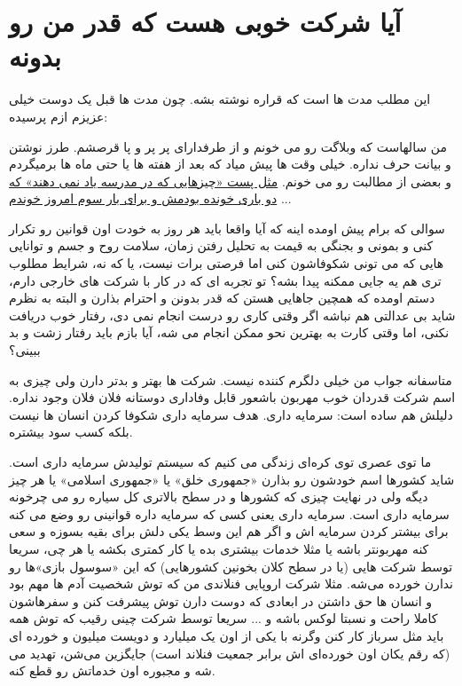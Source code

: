 \section{آیا شرکت خوبی هست که قدر من رو بدونه}
این مطلب مدت ها است که قراره نوشته بشه. چون مدت ها قبل یک دوست خیلی عزیزم ازم پرسیده:
\begin{mybox}
من سالهاست که وبلاگت رو می خونم و از طرفدارای پر پر و پا قرصشم. طرز نوشتن و بیانت حرف نداره. خیلی وقت ها پیش میاد که بعد از هفته ها یا حتی ماه ها برمیگردم و بعضی از مطالبت رو می خونم.
\href{http://jadi.net/2011/04/\%DA\%86\%DB\%8C\%D8\%B2\%D9\%87\%D8\%A7\%DB\%8C\%DB\%8C-\%DA\%A9\%D9\%87-\%D8\%AF\%D8\%B1-\%D9\%85\%D8\%AF\%D8\%B1\%D8\%B3\%D9\%87-\%DB\%8C\%D8\%A7\%D8\%AF-\%D9\%86\%D9\%85\%DB\%8C-\%D8\%AF\%D9\%87\%D9\%86\%D8\%AF/}{مثل پست «چیزهایی که در مدرسه یاد نمی دهند» که دو باری خونده بودمش و برای بار سوم امروز خوندم}
...

سوالی که برام پیش اومده اینه که آیا واقعا باید هر روز به خودت اون قوانین رو تکرار کنی و بمونی و بجنگی به قیمت به تحلیل رفتن زمان، سلامت روح و جسم و توانایی هایی که می تونی شکوفاشون کنی اما فرصتی برات نیست، یا که نه، شرایط مطلوب تری هم یه جایی ممکنه پیدا بشه؟
تو تجربه ای که در کار با شرکت های خارجی دارم، دستم اومده که همچین جاهایی هستن که قدر بدونن و احترام بذارن و البته به نظرم شاید بی عدالتی هم نباشه اگر وقتی کاری رو درست انجام نمی دی، رفتار خوب دریافت نکنی، اما وقتی کارت به بهترین نحو ممکن انجام می شه، آیا بازم باید رفتار زشت و بد ببینی؟
\end{mybox}
متاسفانه جواب من خیلی دلگرم کننده نیست. شرکت ها بهتر و بدتر دارن ولی چیزی به اسم شرکت قدردان خوب مهربون باشعور قابل وفاداری دوستانه فلان فلان وجود نداره. دلیلش هم ساده است: سرمایه داری. هدف سرمایه داری شکوفا کردن انسان ها نیست بلکه کسب سود بیشتره.

ما توی عصری توی کره‌ای زندگی می کنیم که سیستم تولیدش سرمایه داری است. شاید کشورها اسم خودشون رو بذارن «جمهوری خلق» یا «جمهوری اسلامی» یا هر چیز دیگه ولی در نهایت چیزی که کشورها و در سطح بالاتری کل سیاره رو می چرخونه سرمایه داری است. سرمایه داری یعنی کسی که سرمایه داره قوانینی رو وضع می کنه برای بیشتر کردن سرمایه اش و اگر هم این وسط یکی دلش برای بقیه بسوزه و سعی کنه مهربونتر باشه یا مثلا خدمات بیشتری بده یا کار کمتری بکشه یا هر چی، سریعا توسط شرکت هایی (یا در سطح کلان بخونین کشورهایی) که این «سوسول بازی»ها رو ندارن خورده می‌شه. مثلا شرکت اروپایی فنلاندی من که توش شخصیت آدم ها مهم بود و انسان ها حق داشتن در ابعادی که دوست دارن توش پیشرفت کنن و سفرهاشون کاملا راحت و نسبتا لوکس باشه و ... سریعا توسط شرکت چینی رقیب که توش همه باید مثل سرباز کار کنن وگرنه با یکی از اون یک میلیارد و دویست میلیون و خورده ای (که رقم یکان اون خورده‌ای اش برابر جمعیت فنلاند است) جایگزین می‌شن، تهدید می شه و مجبوره اون خدماتش رو قطع کنه.

